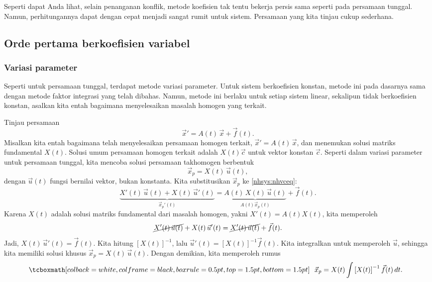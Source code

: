 Seperti dapat Anda lihat, selain penanganan konflik, metode koefisien
tak tentu bekerja persis sama seperti pada
persamaan tunggal.  Namun, perhitungannya dapat dengan cepat menjadi
sangat rumit untuk sistem.  Persamaan yang kita tinjau cukup sederhana.

\subsection{Orde pertama berkoefisien variabel}

\subsubsection{Variasi parameter}

Seperti untuk persamaan tunggal, terdapat metode
variasi parameter.
Untuk sistem berkoefisien konstan, metode ini pada dasarnya
sama dengan metode faktor integrasi yang telah dibahas.
Namun, metode ini berlaku untuk setiap sistem linear, sekalipun tidak
berkoefisien konstan, asalkan kita entah bagaimana menyelesaikan masalah
homogen yang terkait.

Tinjau persamaan
\begin{equation} \label{nhsys:nhvceq}
{\vec{x}}' = A(t) \, \vec{x} + \vec{f}(t) .
\end{equation}
Misalkan kita entah bagaimana telah menyelesaikan persamaan homogen terkait,
${\vec{x}}' = A(t) \, \vec{x}$, dan menemukan
solusi matriks fundamental
$X(t)$.  Solusi umum persamaan homogen terkait
adalah $X(t) \vec{c}$ untuk vektor konstan $\vec{c}$.  Seperti dalam
variasi parameter untuk persamaan tunggal, kita mencoba solusi
persamaan takhomogen berbentuk
\begin{equation*}
\vec{x}_p = X(t)\, \vec{u}(t) ,
\end{equation*}
dengan $\vec{u}(t)$ fungsi bernilai vektor, bukan konstanta.
Kita substitusikan $\vec{x}_p$ ke \eqref{nhsys:nhvceq}:
\begin{equation*}
\underbrace{X'(t)\, \vec{u}(t) + X(t)\, {\vec{u}}'(t)}%
_{{\vec{x}_p}'(t)}
=
\underbrace{A(t)\, X(t)\, \vec{u}(t)}%
_{A(t) \vec{x}_p (t)} 
 + \vec{f}(t) .
\end{equation*}
Karena $X(t)$ adalah solusi matriks fundamental dari masalah homogen,
yakni
$X'(t) = A(t)X(t)$, kita memperoleh
\begin{equation*}
\cancel{X'(t)\, \vec{u}(t)} + X(t)\, {\vec{u}}'(t)
=
\cancel{X'(t)\, \vec{u}(t)} + \vec{f}(t) .
\end{equation*}
Jadi,
$X(t)\, {\vec{u}}'(t) = \vec{f}(t)$.  Kita hitung
$\left[X(t)\right]^{-1}$,
lalu
${\vec{u}}'(t) = \left[X(t)\right]^{-1}\vec{f}(t)$.  Kita integralkan
untuk memperoleh $\vec{u}$, sehingga kita memiliki solusi khusus
$\vec{x}_p = X(t)\, \vec{u}(t)$.
Dengan demikian, kita memperoleh rumus
\begin{equation*}
\mybxbg{~~
\vec{x}_p = 
X(t)
\int \left[X(t)\right]^{-1}\vec{f}(t) \, dt .
~~}
\end{equation*}

